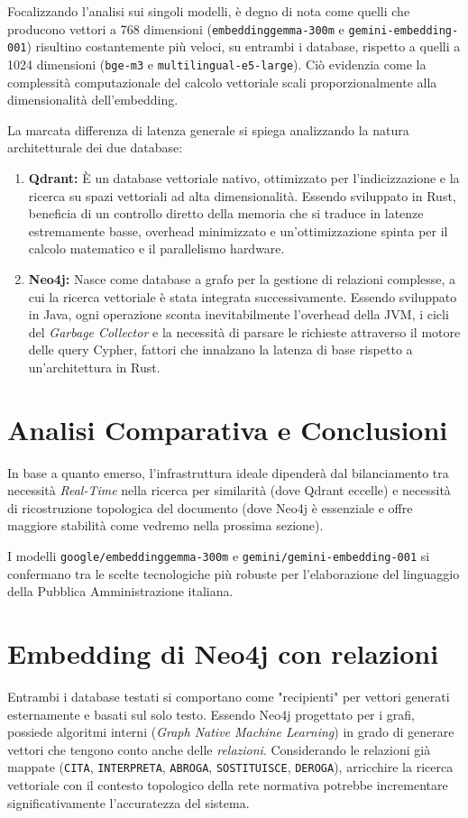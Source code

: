 Focalizzando l'analisi sui singoli modelli, è degno di nota come quelli che producono vettori a 768 dimensioni (\texttt{embeddinggemma-300m} e \texttt{gemini-embedding-001}) risultino costantemente più veloci, su entrambi i database, rispetto a quelli a 1024 dimensioni (\texttt{bge-m3} e \texttt{multilingual-e5-large}). Ciò evidenzia come la complessità computazionale del calcolo vettoriale scali proporzionalmente alla dimensionalità dell'embedding.

La marcata differenza di latenza generale si spiega analizzando la natura architetturale dei due database:
\begin{enumerate}
    \item \textbf{Qdrant:} È un database vettoriale nativo, ottimizzato per l'indicizzazione e la ricerca su spazi vettoriali ad alta dimensionalità. Essendo sviluppato in Rust, beneficia di un controllo diretto della memoria che si traduce in latenze estremamente basse, overhead minimizzato e un'ottimizzazione spinta per il calcolo matematico e il parallelismo hardware.
    \item \textbf{Neo4j:} Nasce come database a grafo per la gestione di relazioni complesse, a cui la ricerca vettoriale è stata integrata successivamente. Essendo sviluppato in Java, ogni operazione sconta inevitabilmente l'overhead della JVM, i cicli del \textit{Garbage Collector} e la necessità di parsare le richieste attraverso il motore delle query Cypher, fattori che innalzano la latenza di base rispetto a un'architettura in Rust.
\end{enumerate}

\section{Analisi Comparativa e Conclusioni}

In base a quanto emerso, l'infrastruttura ideale dipenderà dal bilanciamento tra necessità \textit{Real-Time} nella ricerca per similarità (dove Qdrant eccelle) e necessità di ricostruzione topologica del documento (dove Neo4j è essenziale e offre maggiore stabilità come vedremo nella prossima sezione). 

I modelli \texttt{google/embeddinggemma-300m} e \texttt{gemini/gemini-embedding-001} si confermano tra le scelte tecnologiche più robuste per l'elaborazione del linguaggio della Pubblica Amministrazione italiana.

\section{Embedding di Neo4j con relazioni}
Entrambi i database testati si comportano come "recipienti" per vettori generati esternamente e basati sul solo testo. Essendo Neo4j progettato per i grafi, possiede algoritmi interni (\textit{Graph Native Machine Learning}) in grado di generare vettori che tengono conto anche delle \textit{relazioni}. Considerando le relazioni già mappate (\texttt{CITA}, \texttt{INTERPRETA}, \texttt{ABROGA}, \texttt{SOSTITUISCE}, \texttt{DEROGA}), arricchire la ricerca vettoriale con il contesto topologico della rete normativa potrebbe incrementare significativamente l'accuratezza del sistema.